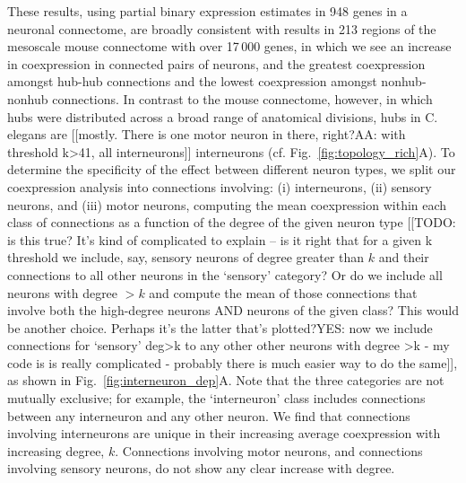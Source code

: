 \documentclass[10pt,letterpaper]{article}
\begin{document}
These results, using partial binary expression estimates in 948 genes in a neuronal connectome, are broadly consistent with results in 213 regions of the mesoscale mouse connectome with over 17\,000 genes, in which we see an increase in coexpression in connected pairs of neurons, and the greatest coexpression amongst hub-hub connections and the lowest coexpression amongst nonhub-nonhub connections.
In contrast to the mouse connectome, however, in which hubs were distributed across a broad range of anatomical divisions, hubs in C. elegans are [[mostly. There is one motor neuron in there, right?AA: with threshold k>41, all interneurons]] interneurons \cite{Towlson:2013gf} (cf. Fig.~\ref{fig:topology_rich}A).
To determine the specificity of the effect between different neuron types, we split our coexpression analysis into connections involving: (i) interneurons, (ii) sensory neurons, and (iii) motor neurons, computing the mean coexpression within each class of connections as a function of the degree of the given neuron type
[[TODO: is this true? It's kind of complicated to explain -- is it right that for a given k threshold we include, say, sensory neurons of degree greater than $k$ and their connections to all other neurons in the `sensory' category? Or do we include all neurons with degree $>k$ and compute the mean of those connections that involve both the high-degree neurons AND neurons of the given class? This would be another choice. Perhaps it's the latter that's plotted?YES: now we include connections for `sensory' deg>k to any other other neurons with degree >k - my code is is really complicated - probably there is much easier way to do the same]], as shown in Fig.~\ref{fig:interneuron_dep}A.
Note that the three categories are not mutually exclusive; for example, the `interneuron' class includes connections between any interneuron and any other neuron.
We find that connections involving interneurons are unique in their increasing average coexpression with increasing degree, $k$.
Connections involving motor neurons, and connections involving sensory neurons, do not show any clear increase with degree.
\end{document}

